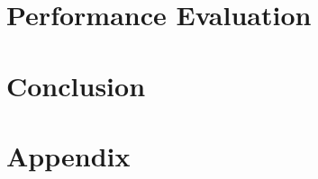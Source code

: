 \documentclass{article}
\begin{document}










\section{Performance Evaluation}




\section{Conclusion}







\section*{Appendix}




\end{document}
